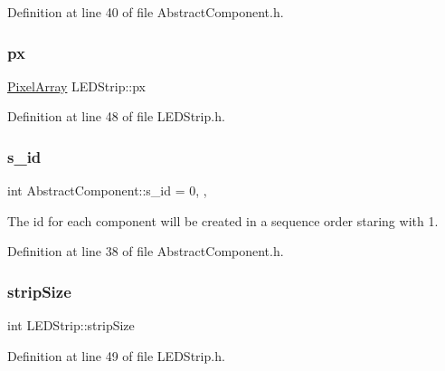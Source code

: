 Definition at line 40 of file Abstract\+Component.\+h.

\mbox{\label{class_l_e_d_strip_aa8a8764862dbb64aedc0b53cfe3fc22b}} 
\subsubsection{\texorpdfstring{px}{px}}
{\footnotesize\ttfamily \hyperlink{class_pixel_array}{Pixel\+Array} L\+E\+D\+Strip\+::px\hspace{0.3cm}{\ttfamily [private]}}



Definition at line 48 of file L\+E\+D\+Strip.\+h.

\mbox{\label{class_abstract_component_a99ce3e5fe7d73dac569b874c15fcaf0d}} 
\subsubsection{\texorpdfstring{s\+\_\+id}{s\_id}}
{\footnotesize\ttfamily int Abstract\+Component\+::s\+\_\+id = 0\hspace{0.3cm}{\ttfamily [static]}, {\ttfamily [protected]}, {\ttfamily [inherited]}}



The id for each component will be created in a sequence order staring with 1. 



Definition at line 38 of file Abstract\+Component.\+h.

\mbox{\label{class_l_e_d_strip_af1987ffe7252fa35b42ad3698c3de454}} 
\subsubsection{\texorpdfstring{strip\+Size}{stripSize}}
{\footnotesize\ttfamily int L\+E\+D\+Strip\+::strip\+Size\hspace{0.3cm}{\ttfamily [private]}}



Definition at line 49 of file L\+E\+D\+Strip.\+h.

